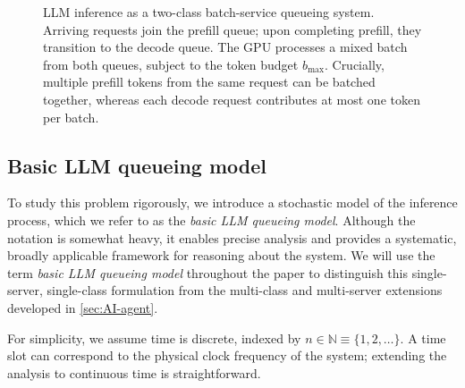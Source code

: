 \documentclass[11pt]{article}
\theoremstyle{plain}
\theoremstyle{definition}
\theoremstyle{remark}
\newcommand{\N}{\mathbb{N}}
\begin{document}
\begin{figure}[t]
\caption{LLM inference as a two-class batch-service queueing system. Arriving requests join the prefill queue; upon completing prefill, they transition to the decode queue. The GPU processes a mixed batch from both queues, subject to the token budget $b_{\max}$. Crucially, multiple prefill tokens from the same request can be batched together, whereas each decode request contributes at most one token per batch.}
\label{fig:two-class-queue}
\end{figure}

\subsection{Basic LLM queueing model}\label{sec:markov-chain}
To study this problem rigorously, we introduce a stochastic model of the inference process, which we refer to as the \emph{basic LLM queueing model}. Although the notation is somewhat heavy, it enables precise analysis and provides a systematic, broadly applicable framework for reasoning about the system. We will use the term \emph{basic LLM queueing model} throughout the paper to distinguish this single-server, single-class formulation from the multi-class and multi-server extensions developed in \cref{sec:AI-agent}.

For simplicity, we assume time is discrete, indexed by $n\in \N\equiv \{1,2,\ldots\}$. A time slot can correspond to the physical clock frequency of the system; extending the analysis to continuous time is straightforward.
\end{document}
